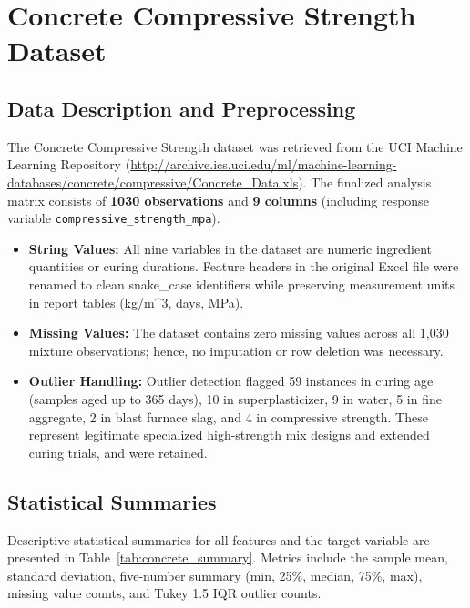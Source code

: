 \documentclass[11pt]{article}
\begin{document}
\section{Concrete Compressive Strength Dataset}

\subsection{Data Description and Preprocessing}
The Concrete Compressive Strength dataset was retrieved from the UCI Machine Learning Repository (\url{http://archive.ics.uci.edu/ml/machine-learning-databases/concrete/compressive/Concrete_Data.xls}). The finalized analysis matrix consists of \textbf{1030 observations} and \textbf{9 columns} (including response variable \texttt{compressive\_strength\_mpa}).

\begin{itemize}
    \item \textbf{String Values:} All nine variables in the dataset are numeric ingredient quantities or curing durations. Feature headers in the original Excel file were renamed to clean snake_case identifiers while preserving measurement units in report tables (kg/m^3, days, MPa).
    \item \textbf{Missing Values:} The dataset contains zero missing values across all 1,030 mixture observations; hence, no imputation or row deletion was necessary.
    \item \textbf{Outlier Handling:} Outlier detection flagged 59 instances in curing age (samples aged up to 365 days), 10 in superplasticizer, 9 in water, 5 in fine aggregate, 2 in blast furnace slag, and 4 in compressive strength. These represent legitimate specialized high-strength mix designs and extended curing trials, and were retained.
\end{itemize}

\subsection{Statistical Summaries}
Descriptive statistical summaries for all features and the target variable are presented in Table~\ref{tab:concrete_summary}. Metrics include the sample mean, standard deviation, five-number summary (min, 25\%, median, 75\%, max), missing value counts, and Tukey 1.5 IQR outlier counts.
\end{document}
